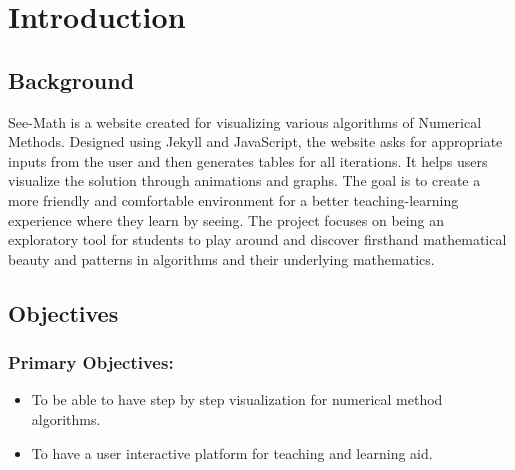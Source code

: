 




\chapter{Introduction}

\section{{\bf{Background}}}

See-Math is a website created for visualizing various algorithms of Numerical Methods. Designed using Jekyll and JavaScript, the website asks for appropriate inputs from the user and then generates tables for all iterations. It helps users visualize the solution through animations and graphs. The goal is to create a more friendly and comfortable environment for a better teaching-learning experience where they learn by seeing. The project focuses on being an exploratory tool for students to play around and discover firsthand mathematical beauty and patterns in algorithms and their underlying mathematics.






\section{{\bf{Objectives}}}

\subsection{Primary Objectives:}
\begin{itemize}
	\item To be able to have step by step visualization for numerical method algorithms.
	\item To have a user interactive platform for teaching and learning aid.
\end{itemize}
